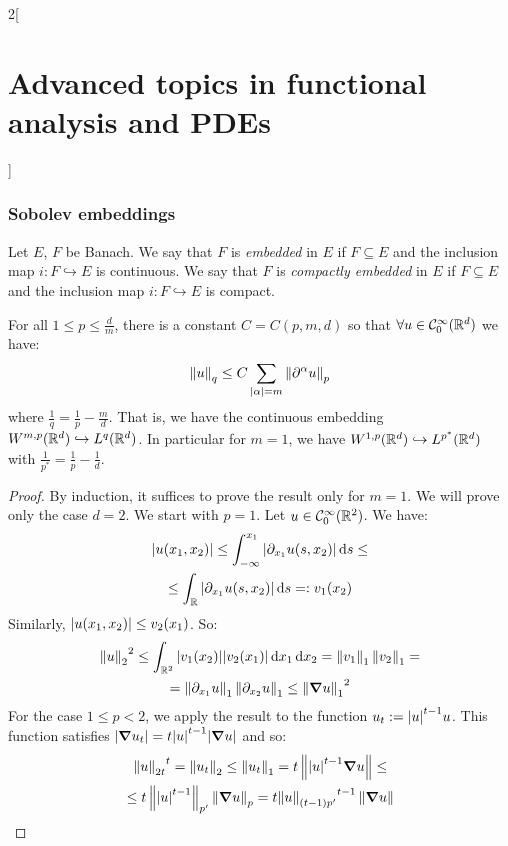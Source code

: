 \documentclass[../../../main_math.tex]{subfiles}
\begin{document}
\begin{multicols}{2}[\section{Advanced topics in functional analysis and PDEs}]
  \subsubsection{Sobolev embeddings}
  \begin{definition}
    Let $E$, $F$ be Banach. We say that $F$ is \emph{embedded} in $E$ if $F\subseteq E$ and the inclusion map $i:F\hookrightarrow  E$ is continuous. We say that $F$ is \emph{compactly embedded} in $E$ if $F\subseteq E$ and the inclusion map $i:F\hookrightarrow  E$ is compact.
  \end{definition}
  \begin{theorem}\label{ATFAPDE:gagliardo_nirengerg_sobolev}
    For all $1\leq p\leq\frac{d}{m}$, there is a constant $C=C(p,m,d)$ so that $\forall u\in \mathcal{C}_0^\infty(\mathbb{R}^d)$ we have:
    $$
      \left\|u\right\|_{q}\leq C\sum_{\abs{\alpha}= m}{\left\|\partial^\alpha u\right\|_p}$$
    where $\displaystyle\frac{1}{q}=\frac{1}{p}-\frac{m}{d}$.
    That is, we have the continuous embedding $W^{m,p}(\mathbb{R}^d)\hookrightarrow L^q(\mathbb{R}^d)$. In particular for $m=1$, we have $W^{1,p}(\mathbb{R}^d)\hookrightarrow L^{p^*}(\mathbb{R}^d)$ with $\displaystyle\frac{1}{p^*}=\frac{1}{p}-\frac{1}{d}$.
  \end{theorem}
  \begin{proof}
    By induction, it suffices to prove the result only for $m=1$. We will prove only the case $d=2$. We start with $p=1$. Let $u\in \mathcal{C}_0^\infty(\mathbb{R}^2)$. We have:
    \begin{multline*}
      \abs{u(x_1,x_2)}\leq \int_{-\infty}^{x_1}\abs{\partial_{x_1}u(s,x_2)}\dd{s}\leq\\\leq\int_{\mathbb{R}}\abs{\partial_{x_1}u(s,x_2)}\dd{s}=:v_1(x_2)
    \end{multline*}
    Similarly, $\abs{u(x_1,x_2)}\leq v_2(x_1)$. So:
    \begin{multline*}
      {\left\|u\right\|_2}^2\leq \int_{\mathbb{R}^2} \abs{v_1(x_2)}\abs{v_2(x_1)}\dd{x_1}\dd{x_2}=\left\|v_1\right\|_1 \left\|v_2\right\|_1=\\=\left\|\partial_{x_1}u\right\|_1\left\|\partial_{x_2}u\right\|_1\leq {\left\|\grad u\right\|_1}^2
    \end{multline*}
    For the case $1\leq p<2$, we apply the result to the function $u_t:=\abs{u}^{t-1}u$. This function satisfies $\abs{\grad u_t}=t\abs{u}^{t-1}\abs{\grad u}$ and so:
    \begin{multline*}
      {\norm{u}_{2t}}^t=\norm{u_t}_2\leq \norm{u_t}_1=t\norm{\abs{u}^{t-1}\grad u}\leq \\\leq t\norm{\abs{u}^{t-1}}_{p'}\norm{\grad u}_p=t{\norm{u}_{(t-1)p'}}^{t-1} \norm{\grad u}

\end{multline*}
\end{proof}
\end{multicols}
\end{document}
